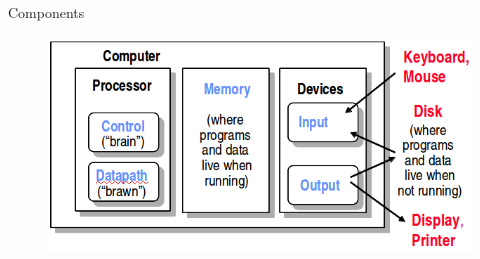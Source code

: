 \documentclass[xcolor=x11names,compress]{beamer}
\renewcommand{\(}{\begin{columns}}
\renewcommand{\)}{\end{columns}}
\newcommand{\<}[1]{\begin{column}{#1}}
\renewcommand{\>}{\end{column}}
\begin{document}
\begin{frame}{Components}
 \begin{figure}
   \begin{center}
     \includegraphics[height=2.25in,clip]{Components}
   \end{center}
 \end{figure}
\end{frame}

\end{document}
